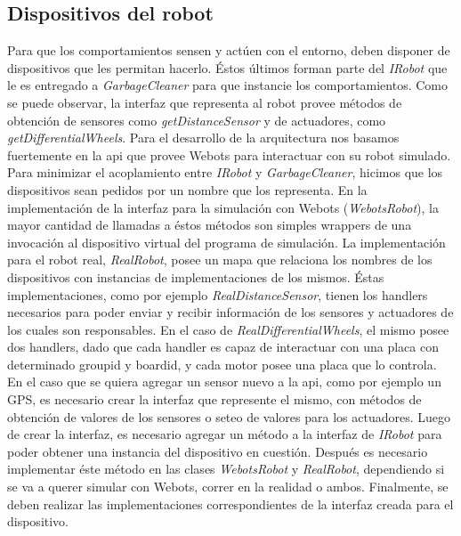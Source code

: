 \subsection{Dispositivos del robot}
Para que los comportamientos sensen y act\'uen con el entorno, deben disponer de dispositivos
que les permitan hacerlo. \'Estos \'ultimos forman parte del \textit{IRobot} que le es entregado a
 \textit{GarbageCleaner} para que instancie los comportamientos. Como se puede observar, la
interfaz que representa al robot provee m\'etodos de obtenci\'on de sensores como \textit{getDistanceSensor}
y de actuadores, como \textit{getDifferentialWheels}. Para el desarrollo de la arquitectura nos basamos
fuertemente en la api que provee Webots para interactuar con su robot simulado.
\\\indent
Para minimizar el acoplamiento entre \textit{IRobot} y \textit{GarbageCleaner}, hicimos que los dispositivos
sean pedidos por un nombre que los representa. En la implementaci\'on de la interfaz para la simulaci\'on
con Webots (\textit{WebotsRobot}), la mayor cantidad de llamadas a \'estos m\'etodos son simples wrappers
de una invocaci\'on al dispositivo virtual del programa de simulaci\'on. La implementaci\'on para el robot
real, \textit{RealRobot}, posee un mapa que relaciona los nombres de los dispositivos con instancias de
implementaciones de los mismos. \'Estas implementaciones, como por ejemplo \textit{RealDistanceSensor},
tienen los handlers necesarios para poder enviar y recibir informaci\'on de los sensores y actuadores de
los cuales son responsables. En el caso de \textit{RealDifferentialWheels}, el mismo posee dos handlers,
dado que cada handler es capaz de interactuar con una placa con determinado groupid y boardid, y cada
motor posee una placa que lo controla.
\\\indent
En el caso que se quiera agregar un sensor nuevo a la api, como por ejemplo un GPS, es necesario
crear la interfaz que represente el mismo, con m\'etodos de obtenci\'on de valores de los sensores o
seteo de valores para los actuadores. Luego de crear la interfaz, es necesario agregar un m\'etodo
a la interfaz de \textit{IRobot} para poder obtener una instancia del dispositivo en cuesti\'on.
Despu\'es es necesario implementar \'este m\'etodo en las clases \textit{WebotsRobot} y \textit{RealRobot},
dependiendo si se va a querer simular con Webots, correr en la realidad o ambos. Finalmente,
se deben realizar las implementaciones correspondientes de la interfaz creada para el dispositivo.

